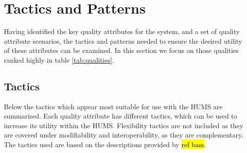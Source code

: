 \documentclass[10pt,a4paper]{article}
\begin{document}
\section{Tactics and Patterns}
\label{sec:tactics}
Having identified the key quality attributes for the system, and a set of quality attribute scenarios, the tactics and patterns needed to ensure the desired utility of these attributes can be examined. In this section we focus on those qualities ranked highly in table \ref{tab:qualities}.

\subsection{Tactics}

Below the tactics which appear most suitable for use with the HUMS are summarised. Each quality attribute has different tactics, which can be used to increase its utility within the HUMS. Flexibility tactics are not included as they are covered under modifiability and interoperability, as they are complementary. The tactics used are based on the descriptions provided by \hl{ref bass}.
\end{document}
